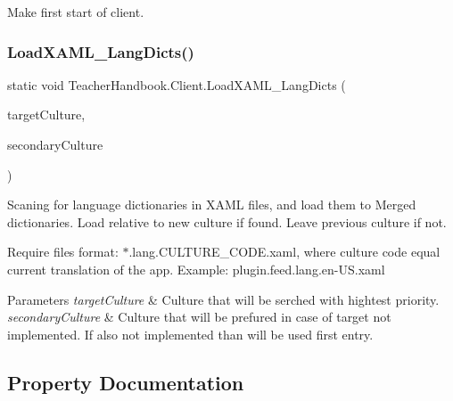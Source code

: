 Make first start of client. 

\mbox{\label{class_teacher_handbook_1_1_client_a863d00fe6a0ac5b86583c0a8245e07e9}} 
\subsubsection{\texorpdfstring{Load\+X\+A\+M\+L\+\_\+\+Lang\+Dicts()}{LoadXAML\_LangDicts()}}
{\footnotesize\ttfamily static void Teacher\+Handbook.\+Client.\+Load\+X\+A\+M\+L\+\_\+\+Lang\+Dicts (\begin{DoxyParamCaption}\item[{Culture\+Info}]{target\+Culture,  }\item[{Culture\+Info}]{secondary\+Culture }\end{DoxyParamCaption})\hspace{0.3cm}{\ttfamily [static]}}



Scaning for language dictionaries in X\+A\+ML files, and load them to Merged dictionaries. Load relative to new culture if found. Leave previous culture if not. 

Require files format\+: $\ast$.lang.\+C\+U\+L\+T\+U\+R\+E\+\_\+\+C\+O\+D\+E.\+xaml, where culture code equal current translation of the app. Example\+: plugin.\+feed.\+lang.\+en-\/\+U\+S.\+xaml 


\begin{DoxyParams}{Parameters}
{\em target\+Culture} & Culture that will be serched with hightest priority.\\
\hline
{\em secondary\+Culture} & Culture that will be prefured in case of target not implemented. If also not implemented than will be used first entry.\\
\hline
\end{DoxyParams}


\subsection{Property Documentation}
\mbox{\label{class_teacher_handbook_1_1_client_a403583a80a8d5040410c4f1f180aafad}} 
